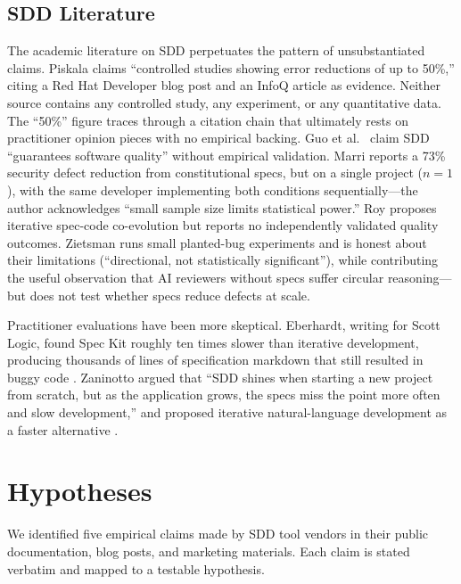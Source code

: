 \documentclass[a4paper,UKenglish,cleveref,autoref,thm-restate]{lipics-v2021}
\begin{document}
\subsection{SDD Literature}

The academic literature on SDD perpetuates the pattern of unsubstantiated claims. Piskala \cite{piskala2026} claims ``controlled studies showing error reductions of up to 50\%,'' citing a Red Hat Developer blog post \cite{naszcyniec2025} and an InfoQ article \cite{griffin2026} as evidence. Neither source contains any controlled study, any experiment, or any quantitative data. The ``50\%'' figure traces through a citation chain that ultimately rests on practitioner opinion pieces with no empirical backing. Guo et al.\ \cite{sedeve2025} claim SDD ``guarantees software quality'' without empirical validation. Marri \cite{marri2026} reports a 73\% security defect reduction from constitutional specs, but on a single project ($n = 1$), with the same developer implementing both conditions sequentially---the author acknowledges ``small sample size limits statistical power.'' Roy \cite{roy2026} proposes iterative spec-code co-evolution but reports no independently validated quality outcomes. Zietsman \cite{zietsman2026} runs small planted-bug experiments and is honest about their limitations (``directional, not statistically significant''), while contributing the useful observation that AI reviewers without specs suffer circular reasoning---but does not test whether specs reduce defects at scale.

Practitioner evaluations have been more skeptical. Eberhardt, writing for Scott Logic, found Spec Kit roughly ten times slower than iterative development, producing thousands of lines of specification markdown that still resulted in buggy code \cite{scottlogic2025}. Zaninotto argued that ``SDD shines when starting a new project from scratch, but as the application grows, the specs miss the point more often and slow development,'' and proposed iterative natural-language development as a faster alternative \cite{zaninotto2025}.

\section{Hypotheses}

We identified five empirical claims made by SDD tool vendors in their public documentation, blog posts, and marketing materials. Each claim is stated verbatim and mapped to a testable hypothesis.
\end{document}
